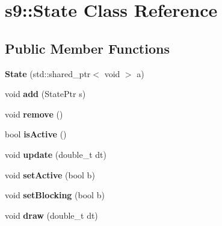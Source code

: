 \hypertarget{classs9_1_1State}{\section{s9\-:\-:State Class Reference}
\label{classs9_1_1State}
}
\subsection*{Public Member Functions}
\begin{DoxyCompactItemize}
\item 
\hypertarget{classs9_1_1State_ae947146d3faa181acc5925975922bb7e}{{\bfseries State} (std\-::shared\-\_\-ptr$<$ void $>$ a)}\label{classs9_1_1State_ae947146d3faa181acc5925975922bb7e}

\item 
\hypertarget{classs9_1_1State_a6bc6db5226b1f59ff8d6b6eb008004d4}{void {\bfseries add} (State\-Ptr s)}\label{classs9_1_1State_a6bc6db5226b1f59ff8d6b6eb008004d4}

\item 
\hypertarget{classs9_1_1State_a56bb933af67b2188fe5bd0de768f370c}{void {\bfseries remove} ()}\label{classs9_1_1State_a56bb933af67b2188fe5bd0de768f370c}

\item 
\hypertarget{classs9_1_1State_a7d7b695be8a77201673f9978a91b0ede}{bool {\bfseries is\-Active} ()}\label{classs9_1_1State_a7d7b695be8a77201673f9978a91b0ede}

\item 
\hypertarget{classs9_1_1State_a39b6502757d4b906d3fd2a50cac969bf}{void {\bfseries update} (double\-\_\-t dt)}\label{classs9_1_1State_a39b6502757d4b906d3fd2a50cac969bf}

\item 
\hypertarget{classs9_1_1State_a5c98596e2fbbb2efea358ed75df8802e}{void {\bfseries set\-Active} (bool b)}\label{classs9_1_1State_a5c98596e2fbbb2efea358ed75df8802e}

\item 
\hypertarget{classs9_1_1State_a6331830cfd29f7d25282b88d84426a3e}{void {\bfseries set\-Blocking} (bool b)}\label{classs9_1_1State_a6331830cfd29f7d25282b88d84426a3e}

\item 
\hypertarget{classs9_1_1State_a93a43a855a402ea74f90b9badc68c249}{void {\bfseries draw} (double\-\_\-t dt)}\label{classs9_1_1State_a93a43a855a402ea74f90b9badc68c249}

\end{DoxyCompactItemize}
